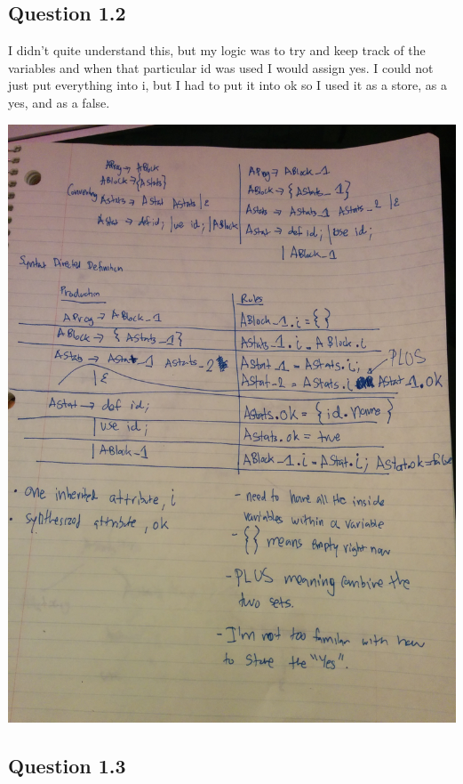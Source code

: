 \documentclass[11pt, oneside]{article}   	%
\begin{document}
\subsection{Question 1.2}

\par I didn't quite understand this, but my logic was to try and keep track of the variables and when that particular id was used I would assign yes. I could not just put everything into i, but I had to put it into ok so I used it as a store, as a yes, and as a false.

\includegraphics[scale=0.15]{IMG_20141008_215627.jpg}

\subsection{Question 1.3}
\end{document}
